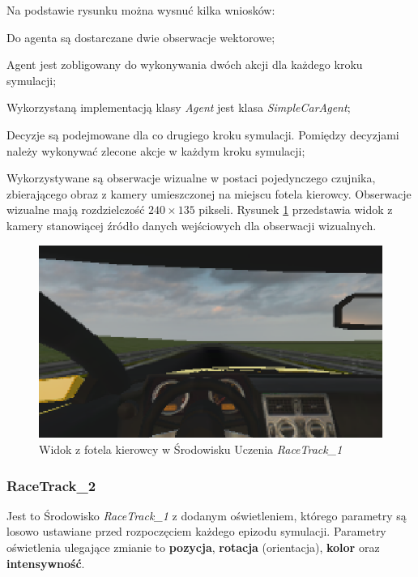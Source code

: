 \noindent
Na podstawie rysunku można wysnuć kilka wniosków:
\vspace{-0.5cm}
\begin{itemize*}
\item Do agenta są dostarczane dwie obserwacje wektorowe;
\item Agent jest zobligowany do wykonywania dwóch akcji dla każdego kroku symulacji;
\item Wykorzystaną implementacją klasy \textit{Agent} jest klasa \textit{SimpleCarAgent};
\item Decyzje są podejmowane dla co drugiego kroku symulacji. Pomiędzy decyzjami należy wykonywać zlecone akcje w każdym kroku symulacji;
\item Wykorzystywane są obserwacje wizualne w postaci pojedynczego czujnika, zbierającego obraz z kamery umieszczonej na miejscu fotela kierowcy. Obserwacje wizualne mają rozdzielczość $240 \times 135$ pikseli. Rysunek \ref{RaceTrack1Cockpit} przedstawia widok z kamery stanowiącej źródło danych wejściowych dla obserwacji wizualnych.
\end{itemize*}

\begin{figure}[h]
\begin{center}
\includegraphics[width=15cm]{resources/figures/race_track_1_cockpit.png}
\caption{Widok z fotela kierowcy w Środowisku Uczenia \textit{RaceTrack\_1}}
\label{RaceTrack1Cockpit}
\end{center}
\end{figure}

\subsubsection{RaceTrack\_2}
Jest to Środowisko \textit{RaceTrack\_1} z dodanym oświetleniem, którego parametry są losowo ustawiane przed rozpoczęciem każdego epizodu symulacji. Parametry oświetlenia ulegające zmianie to \textbf{pozycja}, \textbf{rotacja} (orientacja), \textbf{kolor} oraz \textbf{intensywność}.

